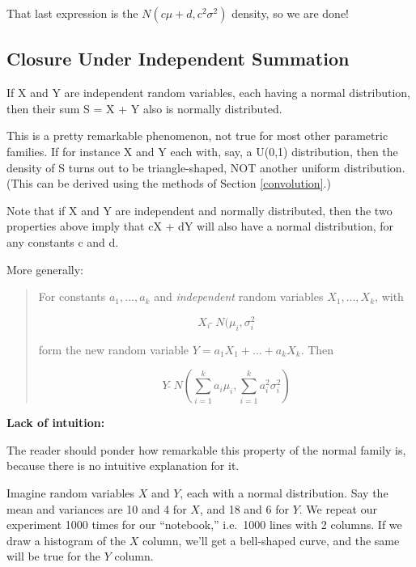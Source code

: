 That last expression is the $N(c\mu+d,c^2\sigma^2)$ density, so we are
done!

\subsection{Closure Under Independent Summation}
\label{sumindep}

If X and Y are independent random variables, each having a normal
distribution, then their sum S = X + Y also is normally distributed.

This is a pretty remarkable phenomenon, not true for most other
parametric families.  If for instance X and Y each with, say, a U(0,1)
distribution, then the density of S turns out to be triangle-shaped, NOT
another uniform distribution.  (This can be derived using the methods of
Section \ref{convolution}.)

Note that if X and Y are independent and normally distributed, then the
two properties above imply that cX + dY will also have a normal
distribution, for any constants c and d.

More generally:

\begin{quote}
For constants $a_1,...,a_k$ and {\it independent} random variables
$X_1,...,X_k$, with

\begin{equation}
X_i ~ \widetilde{ } ~ N(\mu_i, \sigma_i^2
\end{equation}

form the new random variable $Y = a_1 X_1 +...+ a_k X_k$.   Then

\begin{equation}
\label{lincombnormal}
Y ~ \widetilde{ } ~ N(\sum_{i=1}^k a_i \mu_i, \sum_{i=1}^k a_i^2 \sigma_i^2)
\end{equation}
\end{quote}

{\bf Lack of intuition:}

The reader should ponder how remarkable this property of the normal
family is, because there is no intuitive explanation for it.

Imagine random variables $X$ and $Y$, each with a normal distribution.
Say the mean and variances are 10 and 4 for $X$, and 18 and 6 for $Y$.
We repeat our experiment 1000 times for our ``notebook,'' i.e.\ 1000
lines with 2 columns.  If we draw a histogram of the $X$ column, we'll
get a bell-shaped curve, and the same will be true for the $Y$ column.

